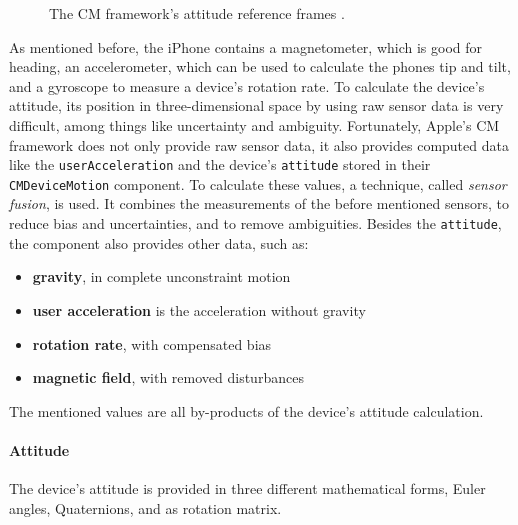 \begin{figure}[p]
      
	\caption{The \acl{CM} framework's attitude reference frames \citep{apple:wwdc_2012_pham}.}
	\label{fig:cm_referenceframes}
\end{figure}


As mentioned before, the iPhone contains a magnetometer, which is good for heading, an accelerometer, which can be used to calculate the phones tip and tilt, and a gyroscope to measure a device's rotation rate. To calculate the device's attitude, its position in three-dimensional space by using raw sensor data is very difficult, among things like uncertainty and ambiguity. Fortunately, Apple's \ac{CM} framework does not only provide raw sensor data, it also provides computed data like the \texttt{userAcceleration} and the device's \texttt{attitude} stored in their \texttt{CMDeviceMotion} component. To calculate these values, a technique, called \emph{sensor fusion}, is used. It combines the measurements of the before mentioned sensors, to reduce bias and uncertainties, and to remove ambiguities. Besides the \texttt{attitude}, the component also provides other data, such as:
\begin{itemize}
  \item \textbf{gravity}, in complete unconstraint motion
  \item \textbf{user acceleration} is the acceleration without gravity
  \item \textbf{rotation rate}, with compensated bias
  \item \textbf{magnetic field}, with removed disturbances
\end{itemize}

\noindent The mentioned values are all by-products of the device's attitude calculation.

\paragraph{Attitude} The device's attitude is provided in three different mathematical forms, Euler angles, Quaternions, and as rotation matrix.

